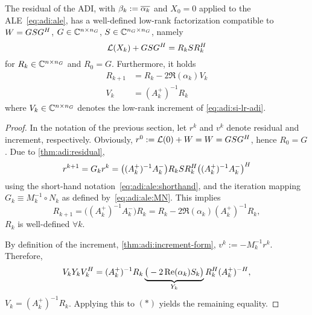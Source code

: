 \begin{theorem}
  The residual of the \ac{ADI},
  with $\beta_k := \conj{\alpha_k}$ and $X_0=0$ applied to the \ac{ALE}~\eqref{eq:adi:ale},
  has a well-defined low-rank factorization compatible to $W = GSG^H$,
  $G\in\mathbb{C}^{n\times n_G}$, $S\in\mathbb{C}^{n_G\times n_G}$, namely
  \begin{equation*}
    \operatorname{\mathcal L}(X_k) + G S G^H = R_k S R_k^H
  \end{equation*}
  for $R_k \in\mathbb{C}^{n\times n_G}$ and $R_0 = G$.
  Furthermore, it holds
  \begin{align*}
    R_{k+1} &= R_k - 2\Re(\alpha_k) V_k \\
    V_k &= (A_k^+)^{-1} R_k
  \end{align*}
  where $V_k \in\mathbb{C}^{n\times n_G}$ denotes the low-rank increment of \eqref{eq:adi:si-lr-adi}.
\end{theorem}
\begin{proof}
  In the notation of the previous section,
  let $r^k$ and $v^k$ denote residual and increment, respectively.
  Obviously, $r^0 := \operatorname{\mathcal L}(0) + W = W = GSG^H$, hence $R_0 = G$.
  Due to \autoref{thm:adi:residual},
  \begin{equation*}
    r^{k+1}
    = G_k r^k
    = \big( (A_k^+)^{-1} A_k^- \big)
    R_k S R_k^H
    \big( (A_k^+)^{-1} A_k^- \big)^H
  \end{equation*}
  using the short-hand notation~\eqref{eq:adi:ale:shorthand},
  and the iteration mapping $G_k \equiv M_k^{-1} \circ N_k$ as defined by~\eqref{eq:adi:ale:MN}.
  This implies
  \begin{equation*}
  \tag{$\ast$}
    R_{k+1}
    = \big( (A_k^+)^{-1} A_k^- \big) R_k
    = R_k - 2\Re(\alpha_k) (A_k^+)^{-1} R_k
    ,
  \end{equation*}
  \ie $R_k$ is well-defined $\forall k$.

  By definition of the increment,
  \cf \autoref{thm:adi:increment-form},
  $v^k := -M_k^{-1} r^k$.
  Therefore,
  \begin{equation*}
    V_k Y_k V_k^H
    = (A_k^+)^{-1} R_k
    \underbrace{
      \big( -2 \operatorname{Re}(\alpha_k) S_k \big)
    }_{Y_k}
    R_k^H (A_k^+)^{-H}
    ,
  \end{equation*}
  \ie $V_k = (A_k^+)^{-1} R_k$.
  Applying this to $(\ast)$ yields the remaining equality.
\end{proof}


